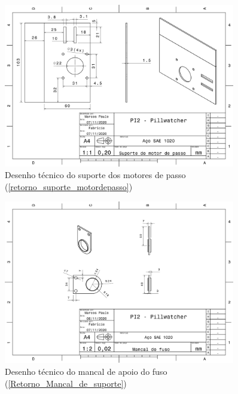 \begin{apendicesenv}
\begin{figure}[H]
    \centering
    \includegraphics[width=0.9\textwidth]{figuras/estrutura/Desenhos/Suporte_Motor_Passo.pdf}
    \caption{Desenho técnico do suporte dos motores de passo (\ref{retorno_suporte_motordepasso})}
    \label{fig:supp_motordepasso}
\end{figure}

\begin{figure}[H]
    \centering
    \includegraphics[width=0.9\textwidth]{figuras/estrutura/Desenhos/Mancal_Fuso.pdf}
    \caption{Desenho técnico do mancal de apoio do fuso (\ref{Retorno_Mancal_de_suporte})}
    \label{fig:Mancal_Fuso}
\end{figure}


\end{apendicesenv}
